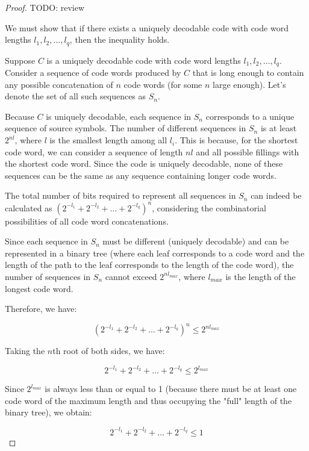 \begin{proof}

{\color{red} TODO: review}

We must show that if there exists a uniquely decodable code with code word lengths \( l_1, l_2, \ldots, l_q \), then the inequality holds.

Suppose \( C \) is a uniquely decodable code with code word lengths \( l_1, l_2, \ldots, l_q \). Consider a sequence of code words produced by \( C \) that is long enough to contain any possible concatenation of \( n \) code words (for some \( n \) large enough). Let's denote the set of all such sequences as \( S_n \). 

Because \( C \) is uniquely decodable, each sequence in \( S_n \) corresponds to a unique sequence of source symbols. The number of different sequences in \( S_n \) is at least \( 2^{nl} \), where \( l \) is the smallest length among all \( l_i \). This is because, for the shortest code word, we can consider a sequence of length \( nl \) and all possible fillings with the shortest code word. Since the code is uniquely decodable, none of these sequences can be the same as any sequence containing longer code words.

The total number of bits required to represent all sequences in \( S_n \) can indeed be calculated as \( (2^{-l_1} + 2^{-l_2} + \ldots + 2^{-l_q})^n \), considering the combinatorial possibilities of all code word concatenations.

Since each sequence in \( S_n \) must be different (uniquely decodable) and can be represented in a binary tree (where each leaf corresponds to a code word and the length of the path to the leaf corresponds to the length of the code word), the number of sequences in \( S_n \) cannot exceed \( 2^{nl_{max}} \), where \( l_{max} \) is the length of the longest code word.

Therefore, we have:

\[
(2^{-l_1} + 2^{-l_2} + \ldots + 2^{-l_q})^n \leq 2^{nl_{max}}
\]

Taking the \( n \)th root of both sides, we have:

\[
2^{-l_1} + 2^{-l_2} + \ldots + 2^{-l_q} \leq 2^{l_{max}}
\]

Since \( 2^{l_{max}} \) is always less than or equal to 1 (because there must be at least one code word of the maximum length and thus occupying the "full" length of the binary tree), we obtain:

\[
2^{-l_1} + 2^{-l_2} + \ldots + 2^{-l_q} \leq 1
\]


\end{proof}
